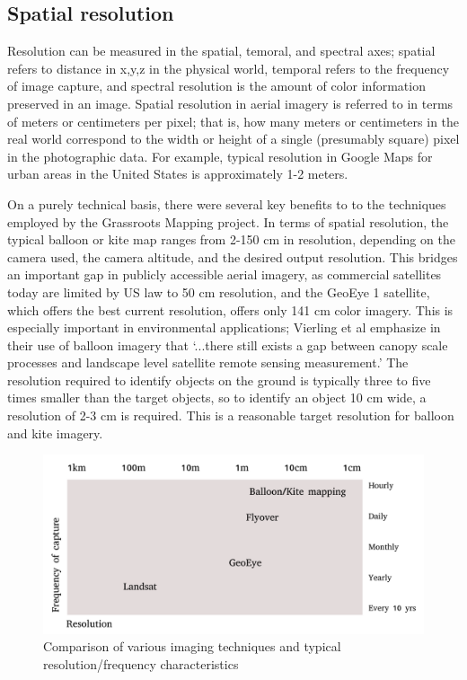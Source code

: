 \documentclass[11pt]{report}
\begin{document}
\subsection{Spatial resolution}

Resolution can be measured in the spatial, temoral, and spectral axes; spatial refers to distance in x,y,z in the physical world, temporal refers to the frequency of image capture, and spectral resolution is the amount of color information preserved in an image. Spatial resolution in aerial imagery is referred to in terms of meters or centimeters per pixel; that is, how many meters or centimeters in the real world correspond to the width or height of a single (presumably square) pixel in the photographic data. For example, typical resolution in Google Maps for urban areas in the United States is approximately 1-2 meters. 
 
On a purely technical basis, there were several key benefits to to the techniques employed by the Grassroots Mapping project. In terms of spatial resolution, the typical balloon or kite map ranges from 2-150 cm in resolution, depending on the camera used, the camera altitude, and the desired output resolution. This bridges an important gap in publicly accessible aerial imagery, as commercial satellites today are limited by US law to 50 cm resolution, and the GeoEye 1 satellite, which offers the best current resolution, offers only 141 cm color imagery. This is especially important in environmental applications; Vierling et al emphasize in their use of balloon imagery that `...there still exists a gap between canopy scale processes and landscape level satellite remote sensing measurement.' \cite{vierling2006short} The resolution required to identify objects on the ground is typically three to five times smaller than the target objects, so to identify an object 10 cm wide, a resolution of 2-3 cm is required. \cite{aber2002unmanned} This is a reasonable target resolution for balloon and kite imagery. 


\begin{figure}[h]
  \begin{center}
	\includegraphics[width=1\textwidth]{diagrams/resolution-frequency.pdf}
	\caption{Comparison of various imaging techniques and typical resolution/frequency characteristics}
  \end{center}
\end{figure}
\end{document}
